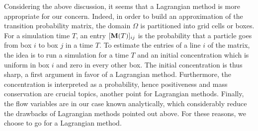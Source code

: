 Considering the above discussion, it seems that a Lagrangian method is more appropriate for our concern. Indeed, in order to build an approximation of the transition probability matrix, the domain $\Omega$ is partitioned into grid cells or boxes. For a simulation time $T$, an entry $[\mathbf M(T)]_{ij}$ is the probability that a particle goes from box $i$ to box $j$ in a time $T$. To estimate the entries of a line $i$ of the matrix, the idea is to run a simulation for a time $T$ and an initial concentration which is uniform in box $i$ and zero in every other box. The initial concentration is thus sharp, a first argument in favor of a Lagrangian method. Furthermore, the concentration is interpreted as a probability, hence positiveness and mass conservation are crucial topics, another point for Lagrangian methods. Finally, the flow variables are in our case known analytically, which considerably reduce the drawbacks of Lagrangian methods pointed out above. For these reasons, we choose to go for a Lagrangian method. 



